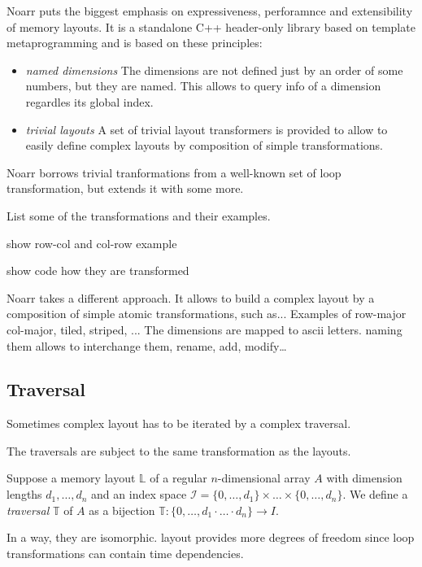 Noarr puts the biggest emphasis on expressiveness, perforamnce and extensibility of memory layouts. It is a standalone C++ header-only library based on template metaprogramming and is based on these principles:
\begin{itemize}
  \item \emph{named dimensions} The dimensions are not defined just by an order of some numbers, but they are named. This allows to query info of a dimension regardles its global index.
  \item \emph{trivial layouts} A set of trivial layout transformers is provided to allow to easily define complex layouts by composition of simple transformations.
\end{itemize}

Noarr borrows trivial tranformations from a well-known set of loop transformation, but extends it with some more. 

List some of the transformations and their examples.

show row-col and col-row example

show code how they are transformed

Noarr takes a different approach. It allows to build a complex layout by a composition of simple atomic transformations, such as... Examples of row-major col-major, tiled, striped, ... The dimensions are mapped to ascii letters. naming them allows to interchange them, rename, add, modify\dots

\subsection{Traversal}

Sometimes complex layout has to be iterated by a complex traversal. 

The traversals are subject to the same transformation as the layouts.

\begin{defn}
  Suppose a memory layout $\mathbb{L}$ of a regular $n$-dimensional array $A$ with dimension lengths $d_1, \dots, d_n$ and an index space $\mathcal{I} = \{0,\dots,d_1\}\times \dots \times \{0,\dots,d_n\}$. We define a \emph{traversal} $\mathbb{T}$ of $A$ as a bijection $\mathbb{T}: \{0,\dots,d_1\cdot \dots \cdot d_n\} \to I$.
\end{defn}


In a way, they are isomorphic. layout provides more degrees of freedom since loop transformations can contain time dependencies.

